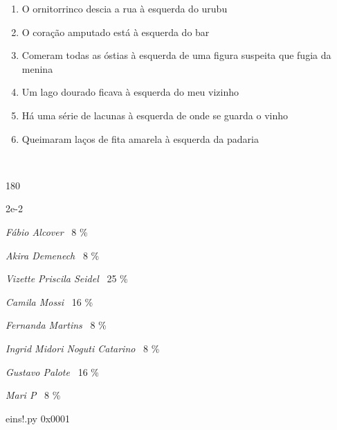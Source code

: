 \documentclass[12pt]{article}
\begin{document}
	\begin{enumerate}


\vfill \item
O ornitorrinco descia a rua	%
à esquerda
do urubu	%

\vfill \item
O coração amputado está	%
à esquerda
do bar	%

\vfill \item
Comeram todas as óstias	%
à esquerda
de uma figura suspeita que fugia da menina	%

\vfill \item
Um lago dourado ficava	%
à esquerda
do meu vizinho	%

\vfill \item
Há uma série de lacunas	%
à esquerda
de onde se guarda o vinho	%

\vfill \item
Queimaram laços de fita amarela	%
à esquerda
da padaria	%
	\end{enumerate}
\pagebreak
			\ttfamily %

	\ 
	\vfill
	\begin{turn}{180}	
		\begin{minipage}{\textwidth}
			\centering
			{\Huge 2e-2}
		  
			\hfill
		  
			

\textit{Fábio Alcover}
	\ 8 \%

\textit{Akira Demenech}
	\ 8 \%

\textit{Vizette Priscila Seidel}
	\ 25 \%

\textit{Camila Mossi}
	\ 16 \%

\textit{Fernanda Martins}
	\ 8 \%

\textit{Ingrid Midori Noguti Catarino}
	\ 8 \%

\textit{Gustavo Palote}
	\ 16 \%

\textit{Mari P}
	\ 8 \%

\bigskip

eins!.py
0x0001


		\end{minipage}	
	\end{turn}
	\vfill
	\

\pagebreak
\end{document}
